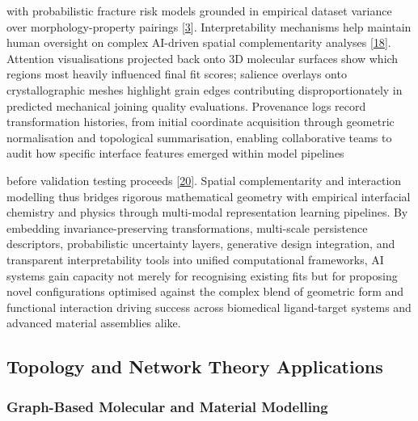 \documentclass[
]{article}
\begin{document}
with probabilistic fracture risk models grounded in empirical dataset
variance over morphology-property pairings
{[}\hyperref[_bookmark43]{3}{]}. Interpretability mechanisms help
maintain human oversight on complex AI-driven spatial complementarity
analyses {[}\hyperref[_bookmark58]{18}{]}. Attention visualisations
projected back onto 3D molecular surfaces show which regions most
heavily influenced final fit scores; salience overlays onto
crystallographic meshes highlight grain edges contributing
disproportionately in predicted mechanical joining quality evaluations.
Provenance logs record transformation histories, from initial coordinate
acquisition through geometric normalisation and topological
summarisation, enabling collaborative teams to audit how specific
interface features emerged within model pipelines

before validation testing proceeds {[}\hyperref[_bookmark60]{20}{]}.
Spatial complementarity and interaction modelling thus bridges rigorous
mathematical geometry with empirical interfacial chemistry and physics
through multi-modal representation learning pipelines. By embedding
invariance-preserving transformations, multi-scale persistence
descriptors, probabilistic uncertainty layers, generative design
integration, and transparent interpretability tools into unified
computational frameworks, AI systems gain capacity not merely for
recognising existing fits but for proposing novel configurations
optimised against the complex blend of geometric form and functional
interaction driving success across biomedical ligand-target systems and
advanced material assemblies alike.

\subsection{Topology and Network Theory
Applications}\label{topology-and-network-theory-applications}

\subsubsection{Graph-Based Molecular and Material
Modelling}\label{graph-based-molecular-and-material-modelling}
\end{document}
